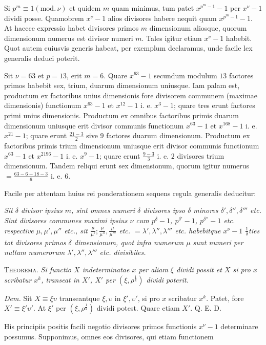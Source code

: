 %
Si $p^m\equiv1(\mathrm{mod.}\,\nu)$ et quidem $m$ quam minimus, tum patet $x^{p^m-1}-1$ per $x^\nu-1$ dividi posse. Quamobrem $x^\nu-1$ alios divisores habere nequit quam $x^{p^m-1}-1$. At haecce expressio habet divisores primos $m$ dimensionum aliosque, quorum dimensionum numerus est divisor numeri $m$. Tales igitur etiam $x^\nu-1$ habebit. Quot autem cuiusvis generis habeat, per exemplum declaramus, unde facile lex generalis deduci poterit.

Sit $\nu=63$ et $p=13$, erit $m=6$. Quare $x^{63}-1$ secundum modulum $13$ factores primos habebit sex, trium, duarum dimensionum uniusque. Iam palam est, productum ex factoribus unius dimensionis fore divisorem communem (maximae dimensionis) functionum $x^{63}-1$ et $x^{12}-1$ i. e. $x^3-1$; quare tres erunt factores primi unius dimensionis. Productum ex omnibus factoribus primis duarum dimensionum uniusque erit divisor communis functionum $x^{63}-1$ et $x^{168}-1$ i. e. $x^{21}-1$; quare erunt $\frac{21-3}2$ sive $9$ factores duarum dimensionum. Productum ex factoribus primis trium dimensionum uniusque erit divisor communis functionum $x^{63}-1$ et $x^{2196}-1$ i. e. $x^9-1$; quare erunt $\frac{9-3}3$ i. e. $2$ divisores trium dimensionum. Tandem reliqui erunt sex dimensionum, quorum igitur numerus $=\frac{63-6-18-3}6$ i. e. $6$.

Facile per attentam huius rei ponderationem sequens regula generalis deducitur:

\emph{Sit $\delta$ divisor ipsius $m$, sint omnes numeri $\delta$ divisores ipso $\delta$ minores $\delta',\delta'',\delta'''$ etc. Sint divisores communes maximi ipsius $\nu$ cum $p^\delta-1$, $p^{\delta'}-1$, $p^{\delta''}-1$ etc. respective $\mu,\mu',\mu''$ etc., sit $\frac\mu{\mu'};\frac\mu{\mu''},\frac\mu{\mu'''}$ etc. $=\lambda',\lambda'',\lambda'''$ etc. habebitque $x^\nu-1$ $\frac1\delta$ties tot divisores primos $\delta$ dimensionum, quot infra numerum $\mu$ sunt numeri per nullum numerorum $\lambda',\lambda'',\lambda'''$ etc. divisibiles.}

\textsc{Theorema.} \emph{Si functio $X$ indeterminatae $x$ per aliam $\xi$ dividi possit et $X$ si pro $x$ scribatur $x^k$, transeat in $X'$, $X'$ per $(\xi,\rho^{\frac1k})$ dividi poterit.}

\emph{Dem.} Sit $X\equiv\xi\upsilon$ transeantque $\xi,\upsilon$ in $\xi',\upsilon'$, si pro $x$ scribatur $x^k$. Patet, fore $X'\equiv\xi'\upsilon'$. At $\xi'$ per $(\xi,\rho^{\frac1k})$ dividi potest. Quare etiam $X'$. Q. E. D.

His principiis positis facili negotio divisores primos functionis $x^\nu-1$ determinare possumus. Supponimus, omnes eos divisores, qui etiam functionem 
